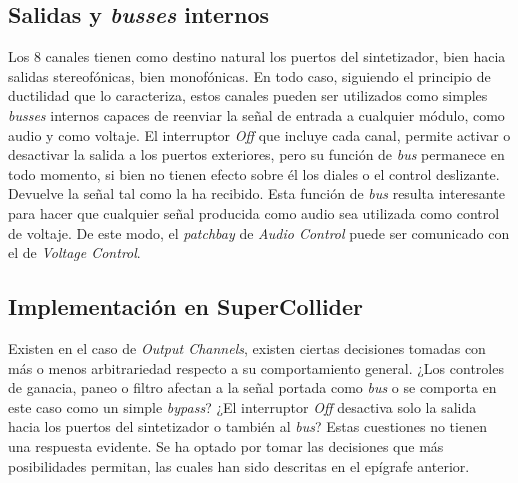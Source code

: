\subsection{Salidas y \textit{busses} internos}
Los 8 canales tienen como destino natural los puertos del sintetizador, bien hacia salidas stereofónicas, bien monofónicas. En todo caso, siguiendo el principio de ductilidad que lo caracteriza, estos canales pueden ser utilizados como simples \textit{busses} internos capaces de reenviar la señal de entrada a cualquier módulo, como audio y como voltaje. El interruptor \textit{Off} que incluye cada canal, permite activar o desactivar la salida a los puertos exteriores, pero su función de \textit{bus} permanece en todo momento, si bien no tienen efecto sobre él los diales o el control deslizante. Devuelve la señal tal como la ha recibido. Esta función de \textit{bus} resulta interesante para hacer que cualquier señal producida como audio sea utilizada como control de voltaje. De este modo, el \textit{patchbay} de \textit{Audio Control} puede ser comunicado con el de \textit{Voltage Control}.

\subsection{Implementación en SuperCollider}
Existen en el caso de \textit{Output Channels}, existen ciertas decisiones tomadas con más o menos arbitrariedad respecto a su comportamiento general. ¿Los controles  de ganacia, paneo o filtro afectan a la señal portada como \textit{bus} o se comporta en este caso como un simple \textit{bypass}? ¿El interruptor \textit{Off} desactiva solo la salida hacia los puertos del sintetizador o también al \textit{bus}? Estas cuestiones no tienen una respuesta evidente. Se ha optado por tomar las decisiones que más posibilidades permitan, las cuales han sido descritas en el epígrafe anterior. 